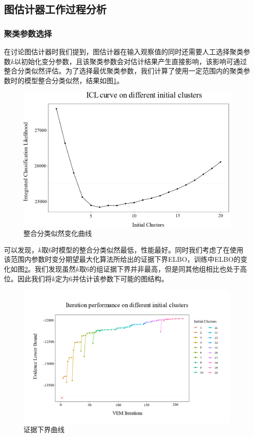 \subsection{图估计器工作过程分析}

\subsubsection{聚类参数选择}

在讨论图估计器时我们提到，图估计器在输入观察值的同时还需要人工选择聚类参数$k$以初始化变分参数，且该聚类参数会对估计结果产生直接影响，该影响可通过整合分类似然评估。为了选择最优聚类参数，我们计算了使用一定范围内的聚类参数时的模型整合分类似然，结果如图\ref{fig:ICL}。

\begin{figure}[!ht]
\centering
\includegraphics[width=12cm]{figures/Chapter4/VEM/Model/ICL.png}
\caption{整合分类似然变化曲线} \label{fig:ICL}
\end{figure}

可以发现，$k$取6时模型的整合分类似然最低，性能最好。同时我们考虑了在使用该范围内参数时变分期望最大化算法所给出的证据下界ELBO，训练中ELBO的变化如图\ref{fig:ELBO}。我们发现虽然$k$取6的组证据下界并非最高，但是同其他组相比也处于高位。因此我们将$k$定为6并估计该参数下可能的图结构。

\begin{figure}[!ht]
\centering
\includegraphics[width=14cm]{figures/Chapter4/VEM/Model/ELBO.png}
\caption{证据下界曲线} \label{fig:ELBO}
\end{figure}


